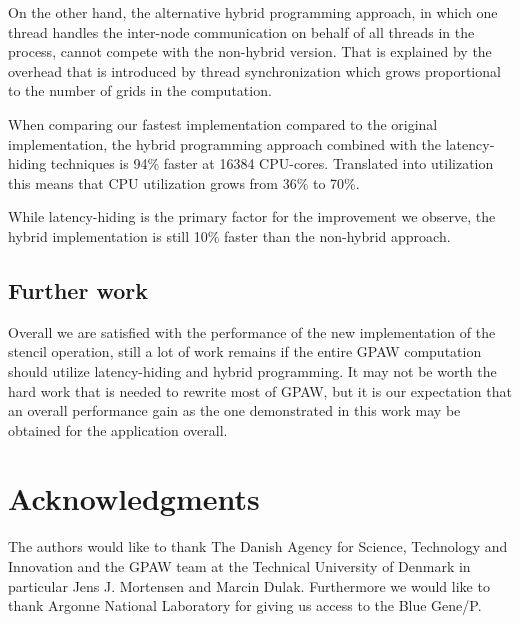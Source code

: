 \documentclass[preprint,3p,times,twocolumn]{elsarticle}
\begin{document}
On the other hand, the alternative hybrid programming approach, in which one thread handles the inter-node communication on behalf of all threads in the process, cannot compete with the non-hybrid version. That is explained by the overhead that is introduced by thread synchronization which grows proportional to the number of grids in the computation.

When comparing our fastest implementation compared to the original implementation, the hybrid programming approach combined with the latency-hiding techniques is 94\% faster at 16384 CPU-cores. Translated into utilization this means that CPU utilization grows from 36\% to 70\%.

While latency-hiding is the primary factor for the improvement we observe, the hybrid implementation is still 10\% faster than the non-hybrid approach.

\subsection{Further work}
Overall we are satisfied with the performance of the new implementation of the stencil operation, still a lot of work remains if the entire GPAW computation should utilize latency-hiding and hybrid programming. It may not be worth the hard work that is needed to rewrite most of GPAW, but it is our expectation that an overall performance gain as the one demonstrated in this work may be obtained for the application overall.

\section{Acknowledgments}
The authors would like to thank The Danish Agency for Science, Technology and Innovation and the GPAW team at the Technical University of Denmark in particular Jens J. Mortensen and Marcin Dulak. Furthermore we would like to thank Argonne National Laboratory for giving us access to the Blue Gene/P.




\end{document}

